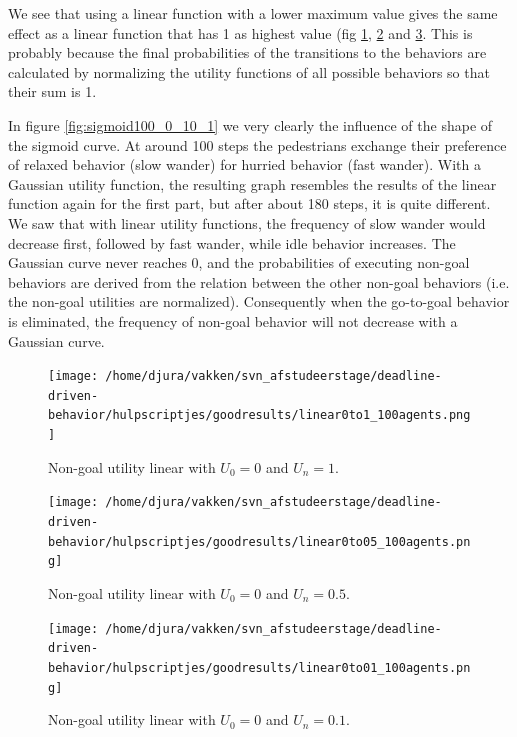 \documentclass[11pt]{book}
\begin{document}
We see that using a linear function with a lower maximum value gives the same effect as a linear function that has 1 as highest value (fig \ref{fig:linear0to1_100agents}, \ref{fig:linear0to0.5_100agents} and \ref{fig:linear0to01_100agents}. This is probably because the final probabilities of the transitions to the behaviors are calculated by normalizing the utility functions of all possible behaviors so that their sum is 1.

In figure \ref{fig:sigmoid100_0_10_1} we very clearly the influence of the shape of the sigmoid curve. At around 100 steps the pedestrians exchange their preference of relaxed behavior (slow wander) for hurried behavior (fast wander). With a Gaussian utility function, the resulting graph resembles the results of the linear function again for the first part, but after about 180 steps, it is quite different. We saw that with linear utility functions, the frequency of slow wander would decrease first, followed by fast wander, while idle behavior increases. The Gaussian curve never reaches 0, and the probabilities of executing non-goal behaviors are derived from the relation between the other non-goal behaviors (i.e. the non-goal utilities are normalized). Consequently when the go-to-goal behavior is eliminated, the frequency of non-goal behavior will not decrease with a Gaussian curve.

\begin{figure}
\centering
\texttt{[image: /home/djura/vakken/svn\_afstudeerstage/deadline-driven-behavior/hulpscriptjes/goodresults/linear0to1\_100agents.png]}
\caption{Non-goal utility linear with $U_0=0$ and $U_n=1$.}
\label{fig:linear0to1_100agents}
\end{figure}


\begin{figure}
\centering
\texttt{[image: /home/djura/vakken/svn\_afstudeerstage/deadline-driven-behavior/hulpscriptjes/goodresults/linear0to05\_100agents.png]}
\caption{Non-goal utility linear with $U_0 = 0$ and $U_n=0.5$.}
\label{fig:linear0to0.5_100agents}
\end{figure}

\begin{figure}
\centering
\texttt{[image: /home/djura/vakken/svn\_afstudeerstage/deadline-driven-behavior/hulpscriptjes/goodresults/linear0to01\_100agents.png]}
\caption{Non-goal utility linear with $U_0=0$ and $U_n=0.1$.}
\label{fig:linear0to01_100agents}
\end{figure}
\end{document}
